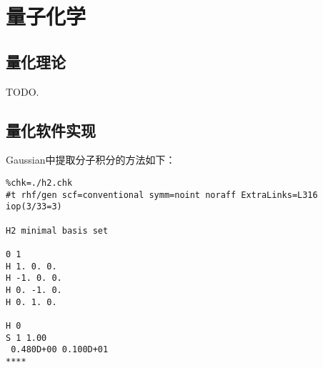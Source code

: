 \chapter[QC]{量子化学}
\section{量化理论}

TODO.

\section{量化软件实现}
Gaussian中提取分子积分的方法如下：
\begin{verbatim}
%chk=./h2.chk
#t rhf/gen scf=conventional symm=noint noraff ExtraLinks=L316 iop(3/33=3)

H2 minimal basis set

0 1
H 1. 0. 0.
H -1. 0. 0.
H 0. -1. 0.
H 0. 1. 0.

H 0
S 1 1.00
 0.480D+00 0.100D+01
****
\end{verbatim}

